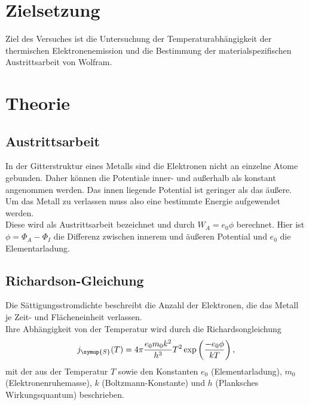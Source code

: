 \section{Zielsetzung}
Ziel des Versuches ist die Untersuchung der Temperaturabhängigkeit der thermischen Elektronenemission und die 
Bestimmung der materialspezifischen Austrittsarbeit von Wolfram. 

\section{Theorie}
\label{sec:Theorie}


\subsection{Austrittsarbeit}
In der Gitterstruktur eines Metalls sind die Elektronen nicht an einzelne Atome gebunden. Daher können die Potentiale inner- und außerhalb als konstant angenommen werden. 
Das innen liegende Potential ist geringer als das äußere. \\
Um das Metall zu verlassen muss also eine bestimmte Energie aufgewendet werden. \\
Diese wird als Austrittsarbeit bezeichnet und durch $W_A = e_0 \phi$ berechnet.
Hier ist $\phi = \Phi_A - \Phi_I$ die Differenz zwischen innerem und äußeren Potential und $e_0$ die Elementarladung. 

  

\subsection{Richardson-Gleichung}
Die Sättigungsstromdichte beschreibt die Anzahl der Elektronen, die das Metall je Zeit- und Flächeneinheit verlassen. \\
Ihre Abhängigkeit von der Temperatur wird durch die Richardsongleichung
\begin{equation}
  j_{\symup{S}}(T) = 4 \pi \frac{e_0 m_0 k^2}{h^3} T^2 \exp\left(\frac{-e_0 \phi}{k T} \right),
  \label{eq:richardson}
\end{equation}
mit der aus der Temperatur $T$ sowie den Konstanten $e_0$ (Elementarladung),
$m_0$ (Elektronenruhemasse), $k$ (Boltzmann-Konstante) und
$h$ (Planksches Wirkungsquantum) beschrieben.\\

